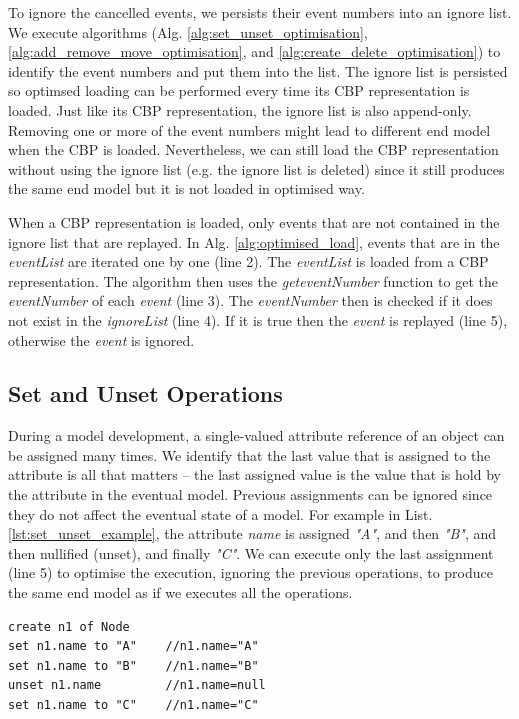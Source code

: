 \documentclass{llncs}
\begin{document}
To ignore the cancelled events, we persists their event numbers into an ignore list. We execute algorithms (Alg. \ref{alg:set_unset_optimisation}, \ref{alg:add_remove_move_optimisation}, and  \ref{alg:create_delete_optimisation}) to identify the event numbers and put them into the list. The ignore list is persisted so optimsed loading can be performed every time its CBP representation is loaded. Just like its CBP representation, the ignore list is also append-only. Removing one or more of the event numbers might lead to different end model when the CBP is loaded. Nevertheless, we can still load the CBP representation without using the ignore list (e.g. the ignore list is deleted) since it still produces the same end model but it is not loaded in optimised way. 

When a CBP representation is loaded, only events that are not contained in the ignore list that are replayed. In Alg. \ref{alg:optimised_load}, events that are in the \emph{eventList} are iterated one by one (line 2). The \emph{eventList} is loaded from a CBP representation. The algorithm then uses the \emph{geteventNumber} function to get the \emph{eventNumber} of each \emph{event} (line 3). The \emph{eventNumber} then is checked if it does not exist in the \emph{ignoreList} (line 4). If it is true then the \emph{event} is replayed (line 5), otherwise the \emph{event} is ignored.      

\subsection{Set and Unset Operations}
\label{subsec:set_and_unset_operations}
During a model development, a single-valued attribute reference of an object can be assigned many times. We identify that the last value that is assigned to the attribute is all that matters -- the last assigned value is the value that is hold by the attribute in the eventual model. Previous assignments can be ignored since they do not affect the eventual state of a model. For example in List. \ref{lst:set_unset_example}, the attribute \emph{name} is assigned \emph{"A"}, and then \emph{"B"}, and then nullified (unset), and finally \emph{"C"}. We can execute only the last assignment (line 5) to optimise the execution, ignoring the previous operations, to produce the same end model as if we executes all the operations. 

\begin{lstlisting}[style=eol,caption={Example of CBP representation of \emph{name} attribute assignments.},label=lst:set_unset_example]
create n1 of Node
set n1.name to "A"    //n1.name="A"    
set n1.name to "B"    //n1.name="B"
unset n1.name         //n1.name=null
set n1.name to "C"    //n1.name="C"
\end{lstlisting}
\end{document}
